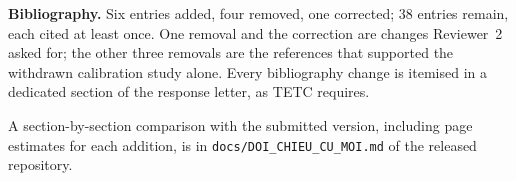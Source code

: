 \documentclass[journal]{IEEEtran}
\begin{document}
\textbf{Bibliography.} Six entries added, four removed, one corrected; $38$
entries remain, each cited at least once. One removal and the correction are
changes Reviewer~2 asked for; the other three removals are the references that
supported the withdrawn calibration study alone. Every bibliography change is
itemised in a dedicated section of the response letter, as TETC requires.

\vspace{8pt}
A section-by-section comparison with the submitted version, including page
estimates for each addition, is in \texttt{docs/DOI\_CHIEU\_CU\_MOI.md} of the
released repository.

\clearpage


\end{document}
